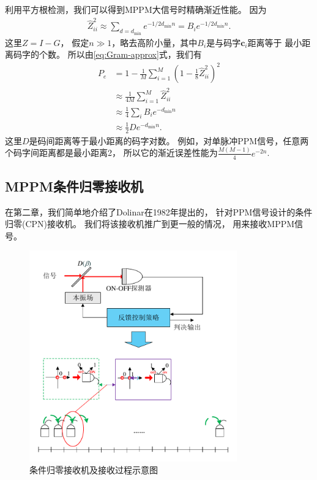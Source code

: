 利用平方根检测，我们可以得到MPPM大信号时精确渐近性能。
因为
\begin{equation}
\begin{split}
\hat{Z}^2_{ii} \approx \sum_{d=d_{\min}} e^{-1/2 d_{\min} n} = B_i e^{-1/2 d_{\min} n}.
\end{split}
\end{equation}
这里$Z = I -G$，
假定$n \gg 1$，略去高阶小量，其中$B_i$是与码字$\bm{c}_i$距离等于
最小距离码字的个数。
所以由\ref{eq:Gram-approx}式，我们有
\begin{equation}
\begin{split}
P_e &= 1 - \frac{1}{M} \sum_{i=1}^M (1 - \frac{1}{8} \hat{Z}^2_{ii})^2 \\
    &\approx \frac{1}{4M} \sum_{i=1}^M \hat{Z}^2_{ii} \\
    &\approx \frac{1}{4} \sum_i B_i e^{-d_{\min} n} \\
    &\approx \frac{1}{2} D e^{-d_{\min} n}.
\end{split}
\end{equation}
这里$D$是码间距离等于最小距离的码字对数。
例如，对单脉冲PPM信号，任意两个码字间距离都是最小距离2，
所以它的渐近误差性能为$\frac{M(M-1)}{4} e^{-2 n}$.



\subsection{MPPM条件归零接收机}
在第二章，我们简单地介绍了Dolinar在1982年提出的，
针对PPM信号设计的条件归零(CPN)接收机。
我们将该接收机推广到更一般的情况，
用来接收MPPM信号。


\begin{figure}
\centering
  \includegraphics[width=0.8\textwidth]{figures/chap4/CPN}
  \caption{条件归零接收机及接收过程示意图}
  \label{fig:CPN}
\end{figure}

